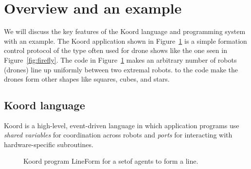 \section{Overview and an example}
\label{sec:overview}

%

We will discuss the key features of the Koord language and programming system with an example. The Koord application shown in Figure~\ref{fig:lineform} is a simple  formation control protocol of the type often used for drone shows like the one seen in Figure~\ref{fig:firefly}. The code in Figure~\ref{fig:lineform} makes an arbitrary number of robots (drones) line up uniformly between two extremal robots.  to the code make the drones form other shapes like  squares, cubes, and stars. 


\subsection{Koord language}
\label{sec:koord-language}
Koord is a high-level, event-driven language in which application programs use  {\em shared variables\/}  for coordination across robots and  {\em ports\/} for   interacting  with hardware-specific subroutines. 

%



\begin{figure}[h!]
    {
        
    }
    {
        
    }
    \caption{Koord program {\sf LineForm} for a setof agents to form a line.}
    \label{fig:lineform}
\end{figure}

